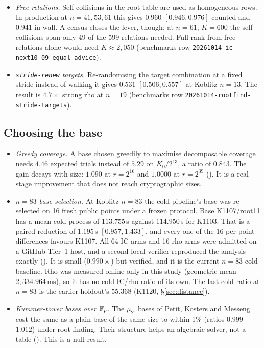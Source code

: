 \begin{itemize}
\item \emph{Free relations.} Self-collisions in the root table are used as
  homogeneous rows. In production at $n=41,53,61$ this gives $0.960$
  $[0.946,0.976]$ counted and $0.941$ in wall. A census closes the lever,
  though: at $n=61$, $K=600$ the self-collisions span only 49 of the 599
  relations needed. Full rank from free relations alone would need
  $K\approx2{,}050$ (benchmarks row
  \texttt{20261014-ic-next10-09-equal-advice}).
\item \emph{\texttt{stride-renew} targets.} Re-randomising the target
  combination at a fixed stride instead of walking it gives $0.531$
  $[0.506,0.557]$ at Koblitz $n=13$. The result is $4.7\times$ strong rho
  at $n=19$ (benchmarks row \texttt{20261014-rootfind-stride-targets}).
\end{itemize}

\subsection{Choosing the base}

\begin{itemize}
\item \emph{Greedy coverage.} A base chosen greedily to maximise
  decomposable coverage needs $4.46$ expected trials instead of $5.29$ on
  $K_0/2^{13}$, a ratio of $0.843$. The gain decays with size: $1.090$ at
  $r=2^{16}$ and $1.0000$ at $r=2^{39}$
  (). It is a real stage
  improvement that does not reach cryptographic sizes.
\item \emph{$n=83$ base selection.} At Koblitz $n=83$ the cold pipeline's
  base was re-selected on 16 fresh public points under a frozen protocol.
  Base K1107/root11 has a mean cold process of $113.755$\,s against
  $114.950$\,s for K1103. That is a paired reduction of $1.195$\,s
  $[0.957,1.433]$, and every one of the 16 per-point differences favours
  K1107. All 64 IC arms and 16 rho arms were admitted on a GitHub Tier~1
  host, and a second local verifier reproduced the analysis exactly
  (). It is small
  ($0.990\times$) but verified, and it is the current $n=83$ cold baseline.
  Rho was measured online only in this study (geometric mean
  $2{,}334.964$\,ms), so it has no cold IC/rho ratio of its own. The last
  cold ratio at $n=83$ is the earlier holdout's $55.368$ (K1120,
  \S\ref{sec:distance}).
\item \emph{Kummer-tower bases over $\mathbb{F}_p$.} The $\mu_{2^t}$ bases of
  Petit, Kosters and Messeng~\cite{pkm2016} cost the same as a plain base
  of the same size to within 1\% (ratios $0.999$--$1.012$) under root
  finding. Their structure helps an algebraic solver, not a table
  (). This is a null result.
\end{itemize}

